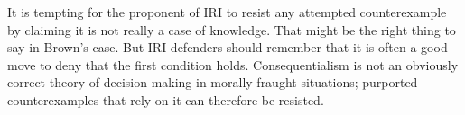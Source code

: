 \documentclass[oneside]{book}
\begin{document}
\noindent It is tempting for the proponent of IRI to resist any attempted counterexample by claiming it is not really a case of knowledge. That might be the right thing to say in Brown's case. But IRI defenders should remember that it is often a good move to deny that the first condition holds. Consequentialism is not an obviously correct theory of decision making in morally fraught situations; purported counterexamples that rely on it can therefore be resisted.






\theendnotes
\end{document}
